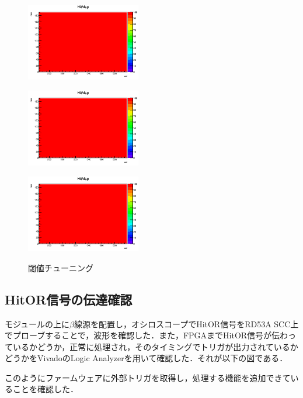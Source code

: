 \begin{figure}[h]
  \centering
  \begin{minipage}[b]{0.3\linewidth}
    \centering
    \includegraphics[width=5cm]{./figure/DigitalScan.png}
    \label{fig:scurve}
  \end{minipage}
  \begin{minipage}[b]{0.3\linewidth}
    \centering
    \includegraphics[width=5cm]{./figure/DigitalScan.png}
    \label{fig:ThrDistBefore}
  \end{minipage}
  \begin{minipage}[b]{0.3\linewidth}
    \centering
    \includegraphics[width=5cm]{./figure/DigitalScan.png}
    \label{fig:scurve}
  \end{minipage}
  \caption{閾値チューニング}
\end{figure}


\subsection{HitOR信号の伝達確認}
モジュールの上に$\beta$線源を配置し，オシロスコープでHitOR信号をRD53A SCC上でプローブすることで，波形を確認した．また，FPGAまでHitOR信号が伝わっているかどうか，正常に処理され，そのタイミングでトリガが出力されているかどうかをVivadoのLogic Analyzerを用いて確認した．それが以下の図である．



このようにファームウェアに外部トリガを取得し，処理する機能を追加できていることを確認した．






